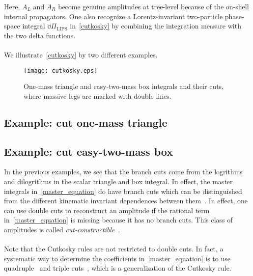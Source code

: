 Here, $A_L$ and $A_R$ become genuine amplitudes at tree-level because of the on-shell internal propagators. 
One also recognize a Lorentz-invariant two-particle phase-space integral $\dd\Pi_{\mathrm{LIPS}}$ in~\cref{cutkosky} by combining the integration measure with the two delta functions.
\\\\
We illustrate~\cref{cutkosky} by two different examples.
%
%
\begin{figure}[h]
  \centering
  \texttt{[image: cutkosky.eps]}
  \caption{One-mass triangle and easy-two-mass box integrals and their cuts, where massive legs are marked with double lines.}
  \label{fig-cutkosky}
\end{figure}
\subsection{Example: cut one-mass triangle}

\subsection{Example: cut easy-two-mass box}


%
In the previous examples, we see that the branch cuts come from the logrithms and dilogrithms in the scalar triangle and box integral. 
In effect, the master integrals in~\cref{master_equation} do have branch cuts which can be distinguished from the different kinematic invariant dependences between them~\cite{Bern:1993kr}.
In effect, one can use double cuts to reconstruct an amplitude if the rational term in~\cref{master_equation} is missing because it has no branch cuts.
This class of amplitudes is called \textit{cut-constructible}~\cite{Bern:1994cg}. 
\\\\
Note that the Cutkosky rules are not restricted to double cuts. 
In fact, a systematic way to determine the coefficients in~\cref{master_equation} is to use quadruple~\cite{BRITTO2005499} and triple cuts~\cite{Forde:2007mi}, which is a generalization of the Cutkosky rule.